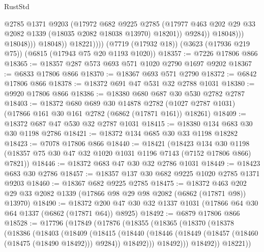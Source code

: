 \begin{lexlean}{RustStd}
\begin{coremodule}
                                @2785
                                @1371
                                @9203
                                (@17972
                                  @682
                                  @9225
                                  @2785
                                  (@17977
                                    @463
                                    @202
                                    @29
                                    @33
                                    @2082
                                    @1339
                                    (@18035 @2082 @18038 @13970)
                                    @18201))
                                @9284))
                            @18048)))
                      @18048)))
                @18048))
            @18221))))
    (@7719 (@17932 @18))
    (@3623 (@17936 @219 @75))
    (@6815 (@17943 @75 @20 @1193 @1020))
@18357 := @7226 @17806 @866
@18365 := @18357 @287 @573 @693 @571 @1020 @2790 @1697 @9202
@18367 := @6833 @17806 @866
@18370 := @18367 @693 @571 @2790
@18372 := @6842 @17806 @866
@18378 := @18372 @691 @47 @531 @32 @2788 @1031
@18380 := @9920 @17806 @866
@18386 := @18380 @680 @687 @30 @530 @2782 @2787
@18403 := @18372
    @680
    @689
    @30
    @14878
    @2782
    (@1027 @2787 @1031)
    (@17866 @161 @30 @161 @2782 (@6862 (@17871 @161)) @18261)
@18409 := @18372 @687 @47 @530 @32 @2787 @1031
@18415 := @18380 @134 @683 @30 @30 @1198 @2786
@18421 := @18372 @134 @685 @30 @33 @1198 @18282
@18423 := @7078 @17806 @866
@18440 := @18421
    (@18423
      @134
      @30
      @1198
      (@18357 @75 @30 @47 @32 @1020 @1031 @1196 @7143 (@7152 @17806 @866) @7821))
@18446 := @18372 @683 @47 @30 @32 @2786 @1031
@18449 := @18423 @683 @30 @2786
@18457 := @18357 @137 @30 @682 @9225 @1020 @2785 @1371 @9203
@18460 := @18367 @682 @9225 @2785
@18475 := @18372
    @463
    @202
    @29
    @33
    @2082
    @1339
    (@17866 @98 @29 @98 @2082 (@6862 (@17871 @98)) @13970)
@18490 := @18372 @200 @47 @30 @32 @1337 @1031 (@17866 @64 @30 @64 @1337 (@6862 (@17871 @64)) @8925)
@18492 := @6879 @17806 @866
@18528 := @17796
    (@17849
      (@17876
        (@18355
          (@18365
            (@18370
              (@18378
                (@18386
                  (@18403
                    (@18409
                      (@18415
                        (@18440
                          (@18446
                            (@18449 (@18457 (@18460 (@18475 (@18490 @18492))) @9284))
                            @18492)))
                      @18492)))
                @18492))
            @18221))

\end{coremodule}
\end{lexlean}
